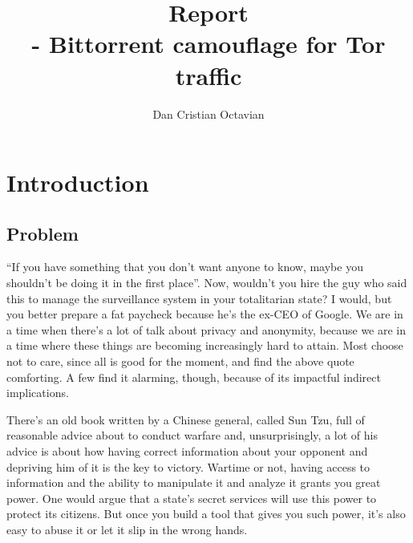\documentclass[11pt]{article} %
\title{Report \\ \projectName- Bittorrent camouflage for Tor traffic}
\author{Dan Cristian Octavian}
\begin{document}
\newcommand{\myparagraph}[1]{\paragraph{#1}\mbox{}\\}
\maketitle

\listoftodos

\tableofcontents

\newpage



\section{Introduction}


\subsection{Problem}


 “If you have something that you don’t want anyone to know, maybe you shouldn’t be doing it in the first place”. Now, wouldn’t you hire the guy who said this to manage the surveillance system in your totalitarian state? I would, but you better prepare a fat paycheck because he’s the ex-CEO of Google. We are in a time when there’s a lot of talk about privacy and anonymity, because we are in a time where these things are becoming increasingly hard to attain. Most choose not to care, since all is good for the moment, and find the above quote comforting. A few find it alarming, though, because of its impactful indirect implications.

There’s an old book written by a Chinese general, called Sun Tzu, full of reasonable advice about to conduct warfare and, unsurprisingly, a lot of his advice is about how having correct information about your opponent and depriving him of it is the key to victory. Wartime or not, having access to information and the ability to manipulate it and analyze it grants you great power. One would argue that a state’s secret services will use this power to protect its citizens. But once you build a tool that gives you such power, it’s also easy to abuse it or let it slip in the wrong hands.
\end{document}
